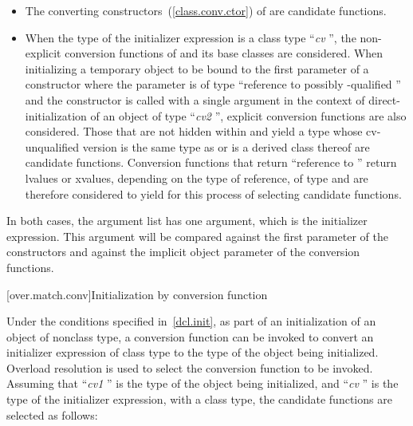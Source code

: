 \begin{itemize}
\item
The converting constructors~(\ref{class.conv.ctor}) of
are candidate functions.
\item
When the type of the initializer expression is a class type
``\textit{cv} '',
the non-explicit conversion functions of
and its base classes are considered.
When initializing a temporary object to be bound to the first parameter of a
constructor
where the parameter is of type
``reference to possibly \cv-qualified ''
and the constructor is
called with a single argument in the context of
direct-initialization of an object of type ``\textit{cv2} '', explicit
conversion functions are also considered.
Those that are not hidden within
and yield a type whose cv-unqualified version is the same type as
or is a derived class thereof
are candidate functions.
Conversion functions that return ``reference to
''
return
lvalues or xvalues, depending on the type of reference, of type
and are therefore considered to yield
for this
process of selecting candidate functions.
\end{itemize}

\pnum
In both cases, the argument list has one argument, which is the initializer
expression.
\enternote
This argument will be compared against
the first parameter of the constructors and against the implicit
object parameter of the conversion functions.
\exitnote

[over.match.conv]{Initialization by conversion function}%

\pnum
Under the conditions specified in~\ref{dcl.init}, as
part of an initialization of an object of nonclass type,
a conversion function can be invoked to convert an initializer
expression of class type to the type of the object
being initialized.
Overload resolution is used to select the
conversion function to be invoked.
Assuming that ``\textit{cv1} '' is the
type of the object being initialized, and ``\textit{cv} '' is the type
of the initializer expression, with
a class type,
the candidate functions are selected as follows:

